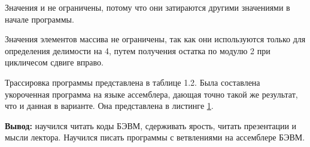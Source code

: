 Значения  и  не ограничены, потому что они затираются другими значениями в начале программы.

Значения элементов массива  не ограничены, так как они используются только для определения делимости на 4, путем получения остатка по модулю 2 при цикличесом сдвиге вправо.


Трассировка программы представлена в таблице 1.2.%
Была составлена укороченная программа на языке ассемблера, дающая точно такой же результат, что и данная в варианте. Она представлена в листинге \ref{lst:improved}.

\begin{figure}[H] %
    \begin{center}
        
    \end{center}
    \label{lst:improved}
\end{figure}

\textbf{Вывод:} научился читать коды БЭВМ, сдерживать ярость, читать презентации и мысли лектора. Научился писать программы с ветвлениями на ассемблере БЭВМ.
\newpage






